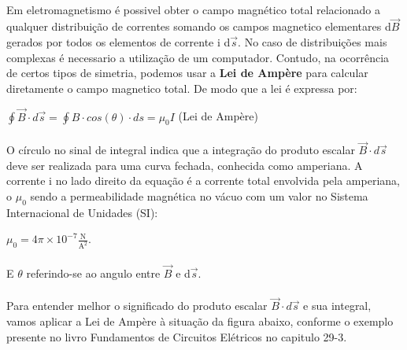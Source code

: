 \documentclass[a4paper, 12pt]{article}
\begin{document}
\paragraph{} Em eletromagnetismo é possivel obter o campo magnético total relacionado a qualquer distribuição de correntes somando os campos magnetico elementares d$\overrightarrow{B}$ gerados por todos os elementos de corrente i d$\overrightarrow{s}$. No caso de distribuições mais complexas é necessario a utilização de um computador. Contudo, na ocorrência de certos tipos de simetria, podemos usar a \textbf{Lei de Ampère} para calcular diretamente o campo magnetico total. De modo que a lei é expressa por:
\begin{mdframed}[backgroundcolor=gray!20]
\begin{center}
		\quad $\oint{\overrightarrow{B}}\cdot d\overrightarrow{s}= \oint{B}\cdot cos(\theta) \cdot ds =\mu _{0}I$  (Lei de Ampère)
		\end{center}
\end{mdframed}
    
   	
\paragraph{}O círculo no sinal de integral indica que a integração do produto escalar $\overrightarrow{B}\cdot d\overrightarrow{s}$ deve ser realizada para uma curva fechada, conhecida como amperiana. A corrente i no lado direito da equação é a corrente total envolvida pela amperiana, o $\mu _{0}$ sendo a permeabilidade magnética no vácuo com um valor no Sistema Internacional de Unidades (SI):
\\
\begin{mdframed}[backgroundcolor=gray!20]
\begin{center}
    ${\displaystyle \mu _{0}=4\pi \times 10^{-7}{\frac {\text{N}}{{\text{A}}^{2}}}}$.
    \end{center}
\end{mdframed}
 
	\paragraph{}E $\theta$ referindo-se ao angulo entre $\overrightarrow{B}$ e d$\overrightarrow{s}$.
   
\paragraph{}Para entender melhor o significado do produto escalar $\overrightarrow{B}\cdot d\overrightarrow{s}$ e sua integral, vamos aplicar a Lei de Ampère à situação da figura abaixo, conforme o exemplo presente no livro Fundamentos de Circuitos Elétricos no capitulo 29-3. \\
\end{document}
